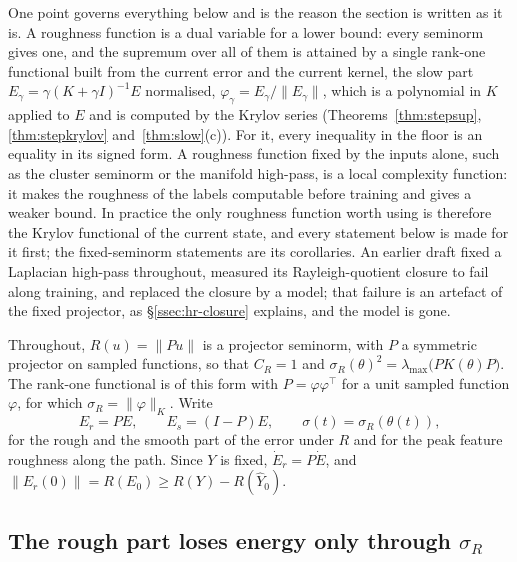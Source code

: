One point governs everything below and is the reason the section is written
as it is. A roughness function is a dual variable for a lower bound: every
seminorm gives one, and the supremum over all of them is attained by a single
rank-one functional built from the current error and the current kernel, the
slow part $E_\gamma=\gamma(K+\gamma I)^{-1}E$ normalised,
$\varphi_\gamma=E_\gamma/\|E_\gamma\|$, which is a polynomial in $K$ applied
to $E$ and is computed by the Krylov series
(Theorems~\ref{thm:stepsup}, \ref{thm:stepkrylov} and~\ref{thm:slow}(c)). For
it, every inequality in the floor is an equality in its signed form. A
roughness function fixed by the inputs alone, such as the cluster seminorm or
the manifold high-pass, is a local complexity function: it makes the roughness
of the labels computable before training and gives a weaker bound. In
practice the only roughness function worth using is therefore the Krylov
functional of the current state, and every statement below is made for it
first; the fixed-seminorm statements are its corollaries. An earlier draft
fixed a Laplacian high-pass throughout, measured its Rayleigh-quotient
closure to fail along training, and replaced the closure by a model; that
failure is an artefact of the fixed projector, as \S\ref{ssec:hr-closure}
explains, and the model is gone.

Throughout, $R(u)=\|Pu\|$ is a projector seminorm, with $P$ a symmetric
projector on sampled functions, so that $C_R=1$ and
$\sigma_R(\theta)^2=\lambda_{\max}\big(PK(\theta)P\big)$. The rank-one
functional is of this form with $P=\varphi\varphi^{\!\top}$ for a unit sampled
function $\varphi$, for which $\sigma_R=\|\varphi\|_K$. Write
\begin{equation}
E_r = PE, \qquad E_s = (I-P)E, \qquad \sigma(t)=\sigma_R(\theta(t)),
\label{eq:split-rs}
\end{equation}
for the rough and the smooth part of the error under $R$ and for the peak
feature roughness along the path. Since $Y$ is fixed, $\dot E_r = P\dot E$,
and $\|E_r(0)\| = R(E_0) \ge R(Y)-R(\hat Y_0)$.

\subsection{The rough part loses energy only through $\sigma_R$}

